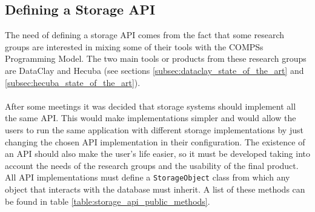 \subsection{Defining a Storage API}
\label{subsec:storage_api}
The need of defining a storage API comes from the fact that some research groups are interested in mixing some of their tools with the COMPSs Programming Model. The two main tools or products from these research groups are DataClay \cite{DataClay} and Hecuba \cite{alomar2015hecuba} (see sections \ref{subsec:dataclay_state_of_the_art} and \ref{subsec:hecuba_state_of_the_art}).\\
\\
After some meetings it was decided that storage systems should implement all the same API. This would make implementations simpler and would allow the users to run the same application with different storage implementations by just changing the chosen API implementation in their configuration. The existence of an API should also make the user's life easier, so it must be developed taking into account the needs of the research groups and the usability of the final product. All API implementations must define a \verb|StorageObject| class from which any object that interacts with the database must inherit. A list of these methods can be found in table \ref{table:storage_api_public_methods}.

